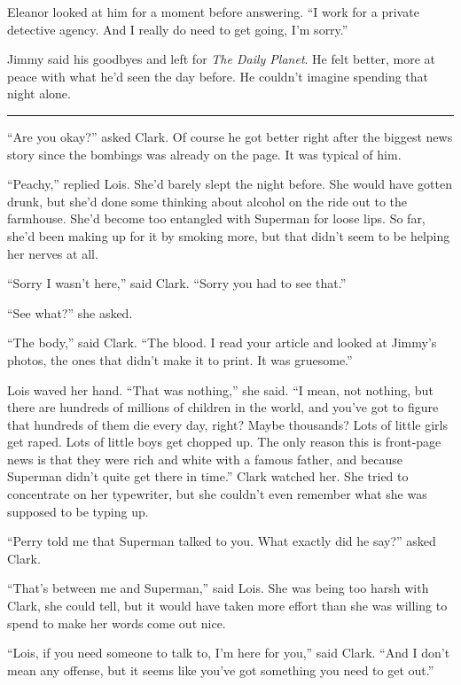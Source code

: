 \documentclass[ebook,12pt]{memoir}
\begin{document}
Eleanor looked at him for a moment before answering. ``I work for a
private detective agency. And I really do need to get going, I'm
sorry.''

Jimmy said his goodbyes and left for \emph{The Daily Planet}. He felt
better, more at peace with what he'd seen the day before. He couldn't
imagine spending that night alone.

\begin{center}\rule{0.5\linewidth}{\linethickness}\end{center}

``Are you okay?'' asked Clark. Of course he got better right after the
biggest news story since the bombings was already on the page. It was
typical of him.

``Peachy,'' replied Lois. She'd barely slept the night before. She would
have gotten drunk, but she'd done some thinking about alcohol on the
ride out to the farmhouse. She'd become too entangled with Superman for
loose lips. So far, she'd been making up for it by smoking more, but
that didn't seem to be helping her nerves at all.

``Sorry I wasn't here,'' said Clark. ``Sorry you had to see that.''

``See what?'' she asked.

``The body,'' said Clark. ``The blood. I read your article and looked at
Jimmy's photos, the ones that didn't make it to print. It was
gruesome.''

Lois waved her hand. ``That was nothing,'' she said. ``I mean, not
nothing, but there are hundreds of millions of children in the world,
and you've got to figure that hundreds of them die every day, right?
Maybe thousands? Lots of little girls get raped. Lots of little boys get
chopped up. The only reason this is front‐page news is that they were
rich and white with a famous father, and because Superman didn't quite
get there in time.'' Clark watched her. She tried to concentrate on her
typewriter, but she couldn't even remember what she was supposed to be
typing up.

``Perry told me that Superman talked to you. What exactly did he say?''
asked Clark.

``That's between me and Superman,'' said Lois. She was being too harsh
with Clark, she could tell, but it would have taken more effort than she
was willing to spend to make her words come out nice.

``Lois, if you need someone to talk to, I'm here for you,'' said Clark.
``And I don't mean any offense, but it seems like you've got something
you need to get out.''
\end{document}
